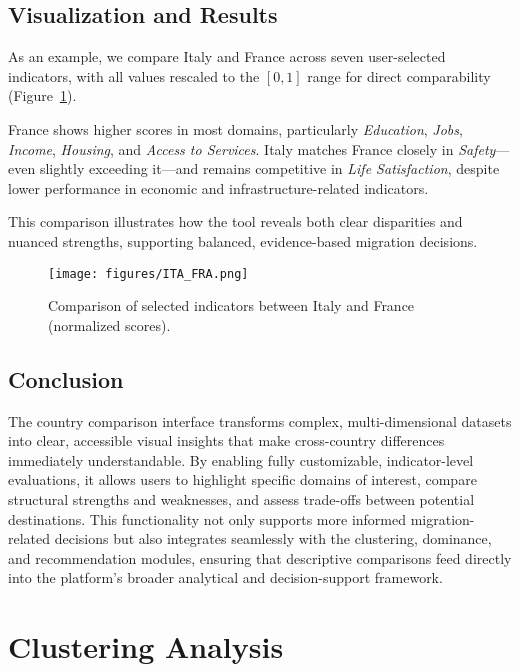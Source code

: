 \documentclass[11pt]{article}
\begin{document}
\subsection{Visualization and Results}

\noindent
As an example, we compare Italy and France across seven user-selected indicators, with all values rescaled to the $[0,1]$ range for direct comparability (Figure~\ref{fig:comparison}).

\noindent
France shows higher scores in most domains, particularly \emph{Education}, \emph{Jobs}, \emph{Income}, \emph{Housing}, and \emph{Access to Services}. Italy matches France closely in \emph{Safety}---even slightly exceeding it---and remains competitive in \emph{Life Satisfaction}, despite lower performance in economic and infrastructure-related indicators. 

\noindent
This comparison illustrates how the tool reveals both clear disparities and nuanced strengths, supporting balanced, evidence-based migration decisions.

\begin{figure}[H]
\centering
\texttt{[image: figures/ITA\_FRA.png]}
\caption{Comparison of selected indicators between Italy and France (normalized scores).}
\label{fig:comparison}
\end{figure}

\subsection{Conclusion}

\noindent
The country comparison interface transforms complex, multi-dimensional datasets into clear, accessible visual insights that make cross-country differences immediately understandable.  
By enabling fully customizable, indicator-level evaluations, it allows users to highlight specific domains of interest, compare structural strengths and weaknesses, and assess trade-offs between potential destinations. 
This functionality not only supports more informed migration-related decisions but also integrates seamlessly with the clustering, dominance, and recommendation modules, ensuring that descriptive comparisons feed directly into the platform’s broader analytical and decision-support framework.



\newpage


\section{Clustering Analysis}
\end{document}
